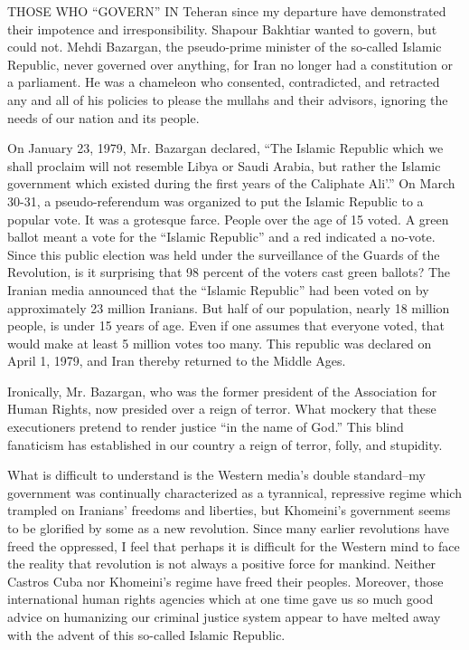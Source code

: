 THOSE WHO “GOVERN” IN Teheran since my departure have demonstrated their impotence and irresponsibility. Shapour Bakhtiar wanted to govern, but could not. Mehdi Bazargan, the pseudo-prime minister of the so-called Islamic Republic, never governed over anything, for Iran no longer had a constitution or a parliament. He was a chameleon who consented, contradicted, and retracted any and all of his policies to please the mullahs and their advisors, ignoring the needs of our nation and its people. 

On January 23, 1979, Mr. Bazargan declared, “The Islamic Republic which we shall proclaim will not resemble Libya or Saudi Arabia, but rather the Islamic government which existed during the first years of the Caliphate Ali'.” On March 30-31, a pseudo-referendum was organized to put the Islamic Republic to a popular vote. It was a grotesque farce. People over the age of 15 voted. A green ballot meant a vote for the “Islamic Republic” and a red indicated a no-vote. Since this public election was held under the surveillance of the Guards of the Revolution, is it surprising that 98 percent of the voters cast green ballots? The Iranian media announced that the “Islamic Republic” had been voted on by approximately 23 million Iranians. But half of our population, nearly 18 million people, is under 15 years of age. Even if one assumes that everyone voted, that would make at least 5 million votes too many. This republic was declared on April 1, 1979, and Iran thereby returned to the Middle Ages. 

Ironically, Mr. Bazargan, who was the former president of the Association for Human Rights, now presided over a reign of terror. What mockery that these executioners pretend to render justice “in the name of God.” This blind fanaticism has established in our country a reign of terror, folly, and stupidity. 

What is difficult to understand is the Western media's double standard--my government was continually characterized as a tyrannical, repressive regime which trampled on Iranians’ freedoms and liberties, but Khomeini’s government seems to be glorified by some as a new revolution. Since many earlier revolutions have freed the oppressed, I feel that perhaps it is difficult for the Western mind to face the reality that revolution is not always a positive force for mankind. Neither Castros Cuba nor Khomeini’s regime have freed their peoples. Moreover, those international human rights agencies which at one time gave us so much good advice on humanizing our criminal justice system appear to have melted away with the advent of this so-called Islamic Republic. 

